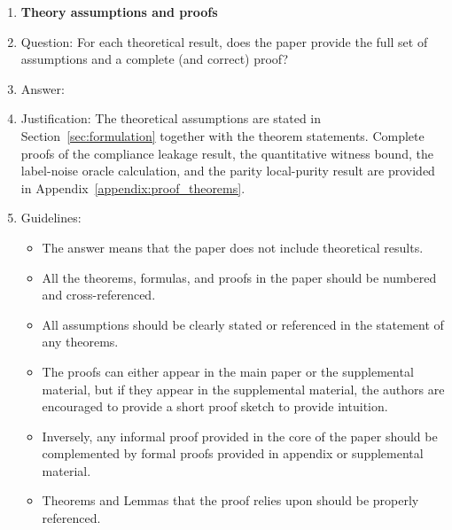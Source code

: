 \documentclass{article}
\theoremstyle{plain}
\theoremstyle{definition}
\theoremstyle{remark}
\begin{document}
\begin{enumerate}
\begin{itemize}
        \item If applicable, the authors should discuss possible limitations of their approach to address problems of privacy and fairness.
        \item While the authors might fear that complete honesty about limitations might be used by reviewers as grounds for rejection, a worse outcome might be that reviewers discover limitations that aren't acknowledged in the paper. The authors should use their best judgment and recognize that individual actions in favor of transparency play an important role in developing norms that preserve the integrity of the community. Reviewers will be specifically instructed to not penalize honesty concerning limitations.
    \end{itemize}

\item {\bf Theory assumptions and proofs}
    \item[] Question: For each theoretical result, does the paper provide the full set of assumptions and a complete (and correct) proof?
    \item[] Answer: \answerYes{}
    \item[] Justification: The theoretical assumptions are stated in Section~\ref{sec:formulation} together with the theorem statements. Complete proofs of the compliance leakage result, the quantitative witness bound, the label-noise oracle calculation, and the parity local-purity result are provided in Appendix~\ref{appendix:proof_theorems}.
    \item[] Guidelines:
    \begin{itemize}
        \item The answer \answerNA{} means that the paper does not include theoretical results. 
        \item All the theorems, formulas, and proofs in the paper should be numbered and cross-referenced.
        \item All assumptions should be clearly stated or referenced in the statement of any theorems.
        \item The proofs can either appear in the main paper or the supplemental material, but if they appear in the supplemental material, the authors are encouraged to provide a short proof sketch to provide intuition. 
        \item Inversely, any informal proof provided in the core of the paper should be complemented by formal proofs provided in appendix or supplemental material.
        \item Theorems and Lemmas that the proof relies upon should be properly referenced. 
    \end{itemize}


\end{enumerate}
\end{document}
